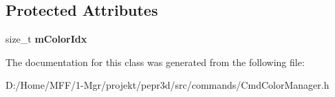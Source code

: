 \subsection*{Protected Attributes}
\begin{DoxyCompactItemize}
\item 
\mbox{\label{classpepr3d_1_1_cmd_color_manager_remove_color_a84f93e44c66e8c5725561f64df3a5f3e}} 
size\+\_\+t {\bfseries m\+Color\+Idx}
\end{DoxyCompactItemize}


The documentation for this class was generated from the following file\+:\begin{DoxyCompactItemize}
\item 
D\+:/\+Home/\+M\+F\+F/1-\/\+Mgr/projekt/pepr3d/src/commands/Cmd\+Color\+Manager.\+h\end{DoxyCompactItemize}
